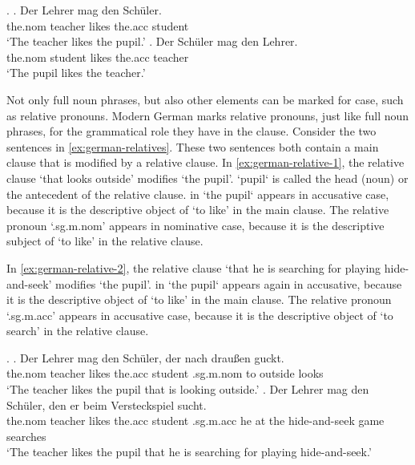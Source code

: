 \ex.\label{ex:german-case}
\ag. Der Lehrer mag den Schüler.\\
 the.\ac{nom} teacher likes the.\ac{acc} student\\
 `The teacher likes the pupil.'\label{ex:german-case-1}
\bg. Der Schüler mag den Lehrer.\\
 the.\ac{nom} student likes the.\ac{acc} teacher\\
 `The pupil likes the teacher.'\label{ex:german-case-2}

Not only full noun phrases, but also other elements can be marked for case, such as relative pronouns. Modern German marks relative pronouns, just like full noun phrases, for the grammatical role they have in the clause. Consider the two sentences in \ref{ex:german-relatives}. These two sentences both contain a main clause that is modified by a relative clause.
In \ref{ex:german-relative-1}, the relative clause  `that looks outside' modifies  `the pupil'.  `pupil` is called the head (noun) or the antecedent of the relative clause.  in  `the pupil` appears in accusative case, because it is the descriptive object of  `to like' in the main clause. The relative pronoun  `.\ac{sg}.\ac{m}.\ac{nom}' appears in nominative case, because it is the descriptive subject of  `to like' in the relative clause.

In \ref{ex:german-relative-2}, the relative clause  `that he is searching for playing hide-and-seek' modifies  `the pupil'.  in  `the pupil` appears again in accusative, because it is the descriptive object of  `to like' in the main clause. The relative pronoun  `.\ac{sg}.\ac{m}.\ac{acc}' appears in accusative case, because it is the descriptive object of  `to search' in the relative clause.

\ex.\label{ex:german-relatives}
\ag. Der Lehrer mag den Schüler, der nach draußen guckt.\\
 the.\ac{nom} teacher likes the.\ac{acc} student .\ac{sg}.\ac{m}.\ac{nom} to outside looks\\
 `The teacher likes the pupil that is looking outside.'\label{ex:german-relative-1}
 \bg. Der Lehrer mag den Schüler, den er beim Versteckspiel sucht.\\
 the.\ac{nom} teacher likes the.\ac{acc} student .\ac{sg}.\ac{m}.\ac{acc} he {at the} {hide-and-seek game} searches\\
 `The teacher likes the pupil that he is searching for playing hide-and-seek.'\label{ex:german-relative-2}

